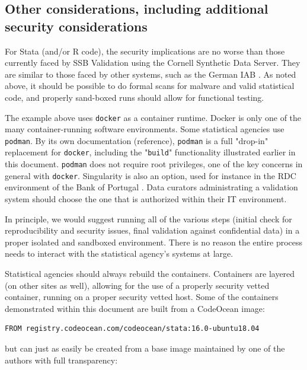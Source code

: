 \documentclass{article}
\begin{document}
\subsection{Other considerations, including additional security considerations}

For Stata (and/or R code), the security implications are no worse than those currently faced by SSB Validation using the Cornell Synthetic Data Server. They are similar to those faced by other systems, such as the German IAB \citep{bender_research-data-centre_2011,muller_institute_2021}. As noted above, it should be possible to do formal scans for malware and valid statistical code, and properly sand-boxed runs should allow for functional testing.

The example above uses \texttt{docker} as a container runtime. Docker is only one of the many container-running software environments. Some statistical agencies use \texttt{podman}. By its own documentation (reference), \texttt{podman} is a full "drop-in" replacement for  \texttt{docker}, including the "\texttt{build}" functionality illustrated earlier in this document. \texttt{podman} does not require root privileges, one of the key concerns in general with \texttt{docker}. Singularity is also an option, used for instance in the RDC environment of the Bank of Portugal \citep{guimaraes_reproducibility_2023}. Data curators administrating a validation system should choose the one that is authorized within their IT environment. 

In principle, we would suggest running all of the various steps (initial check for reproducibility and security issues, final validation against confidential data) in a proper isolated and sandboxed environment. There is no reason the entire process needs to interact with the statistical agency's systems at large.

Statistical agencies should always rebuild the containers. Containers are layered (on other sites as well), allowing for the use of a properly security vetted container, running on a proper security vetted host. Some of the containers demonstrated within this document are built from a CodeOcean image:

\begin{lstlisting}[language=docker]
FROM registry.codeocean.com/codeocean/stata:16.0-ubuntu18.04
\end{lstlisting}

but can just as easily be created from a base image maintained by one of the authors with full transparency:
\end{document}
